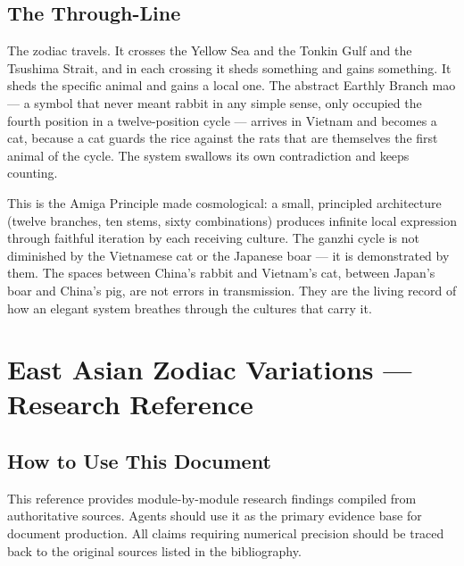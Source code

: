 \documentclass[11pt,letterpaper]{article}
\newcommand{\stageheader}[2]{%
  \noindent\colorbox{#2}{\makebox[\textwidth][l]{%
    \textcolor{white}{\bfseries\sffamily\hspace{6pt}#1\hspace{6pt}}}}%
  \vspace{0.5em}\par%
}
\begin{document}
\subsection{The Through-Line}

The zodiac travels. It crosses the Yellow Sea and the Tonkin Gulf and the Tsushima Strait, and in each crossing it sheds something and gains something. It sheds the specific animal and gains a local one. The abstract Earthly Branch mao --- a symbol that never meant rabbit in any simple sense, only occupied the fourth position in a twelve-position cycle --- arrives in Vietnam and becomes a cat, because a cat guards the rice against the rats that are themselves the first animal of the cycle. The system swallows its own contradiction and keeps counting.

This is the Amiga Principle made cosmological: a small, principled architecture (twelve branches, ten stems, sixty combinations) produces infinite local expression through faithful iteration by each receiving culture. The ganzhi cycle is not diminished by the Vietnamese cat or the Japanese boar --- it is demonstrated by them. The spaces between China's rabbit and Vietnam's cat, between Japan's boar and China's pig, are not errors in transmission. They are the living record of how an elegant system breathes through the cultures that carry it.

\newpage

\stageheader{STAGE 2 --- RESEARCH REFERENCE}{secondary}

\section{East Asian Zodiac Variations --- Research Reference}

\subsection{How to Use This Document}

This reference provides module-by-module research findings compiled from authoritative sources. Agents should use it as the primary evidence base for document production. All claims requiring numerical precision should be traced back to the original sources listed in the bibliography.
\end{document}
